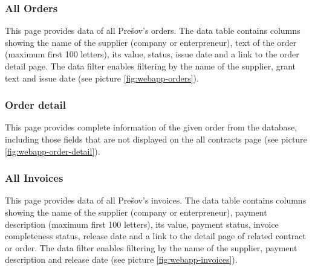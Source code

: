 \documentclass[thesis=B,english]{FITthesis}[2012/06/26]
\begin{document}
\subsubsection{All Orders}
	This page provides data of all Prešov's orders. The data table contains columns showing the name of the  supplier (company or enterpreneur), text of the order (maximum first 100 letters), its value, status, issue date and a link to the order detail page. The data filter enables filtering by the name of the supplier, grant text and issue date (see picture \ref{fig:webapp-orders}).


\subsubsection{Order detail}
	This page provides complete information of the given order from the database, including those fields that are not displayed on the all contracts page (see picture \ref{fig:webapp-order-detail}).


\subsubsection{All Invoices}
	This page provides data of all Prešov's invoices. The data table contains columns showing the name of the  supplier (company or enterpreneur), payment description (maximum first 100 letters), its value, payment status, invoice completeness status, release date and a link to the detail page of related contract or order. The data filter enables filtering by the name of the supplier, payment description and release date (see picture \ref{fig:webapp-invoices}).
\end{document}
